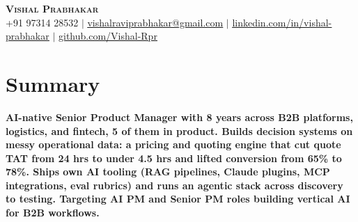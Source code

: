 \renewcommand\labelitemii{$\vcenter{\hbox{\tiny$\bullet$}}$}

\newcommand{\resumeSubHeadingListStart}{\begin{itemize}[leftmargin=0.15in, label={}]}
\newcommand{\resumeSubHeadingListEnd}{\end{itemize}}
\newcommand{\resumeItemListStart}{\begin{itemize}}
\newcommand{\resumeItemListEnd}{\end{itemize}\vspace{-5pt}}





\begin{center}    \textbf{\Huge \scshape Vishal Prabhakar} \\ \vspace{1pt}
    \small +91 97314 28532 $|$ \href{mailto:vishalraviprabhakar@gmail.com}{\underline{vishalraviprabhakar@gmail.com}} $|$
    \href{https://www.linkedin.com/in/vishal-prabhakar}{\underline{linkedin.com/in/vishal-prabhakar}} $|$
    \href{https://github.com/Vishal-Rpr}{\underline{github.com/Vishal-Rpr}}
\end{center}
\section{Summary}
\begin{itemize}[leftmargin=0.15in, label={}]
    \small{\item{
     \textbf{AI-native Senior Product Manager with 8 years across B2B platforms, logistics, and fintech, 5 of them in product. Builds decision systems on messy operational data: a pricing and quoting engine that cut quote TAT from 24 hrs to under 4.5 hrs and lifted conversion from 65\% to 78\%. Ships own AI tooling (RAG pipelines, Claude plugins, MCP integrations, eval rubrics) and runs an agentic stack across discovery to testing. Targeting AI PM and Senior PM roles building vertical AI for B2B workflows.} \\
     }}
\end{itemize}

